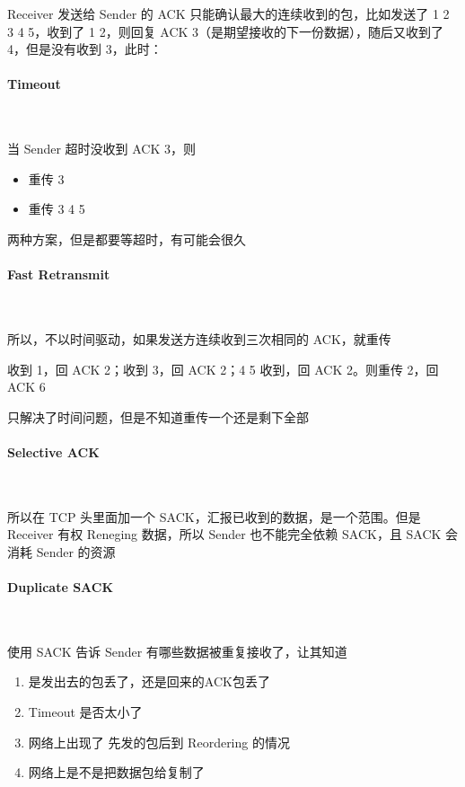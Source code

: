\documentclass[11pt,journal,compsoc]{IEEEtran}
\begin{document}
Receiver 发送给 Sender 的 ACK 只能确认最大的连续收到的包，比如发送了 1 2 3 4 5，收到了 1 2，则回复 ACK 3（是期望接收的下一份数据），随后又收到了 4，但是没有收到 3，此时：

\paragraph{Timeout} ~

当 Sender 超时没收到 ACK 3，则

\begin{itemize}
    \item 重传 3
    \item 重传 3 4 5
\end{itemize}

两种方案，但是都要等超时，有可能会很久

\paragraph{Fast Retransmit} ~

所以，不以时间驱动，如果发送方连续收到三次相同的 ACK，就重传

收到 1，回 ACK 2；收到 3，回 ACK 2；4 5 收到，回 ACK 2。则重传 2，回 ACK 6

只解决了时间问题，但是不知道重传一个还是剩下全部

\paragraph{Selective ACK} ~

所以在 TCP 头里面加一个 SACK，汇报已收到的数据，是一个范围。但是 Receiver 有权 Reneging 数据，所以 Sender 也不能完全依赖 SACK，且 SACK 会消耗 Sender 的资源

\paragraph{Duplicate SACK} ~

使用 SACK 告诉 Sender 有哪些数据被重复接收了，让其知道

\begin{enumerate}
    \item 是发出去的包丢了，还是回来的ACK包丢了

    \item Timeout 是否太小了

    \item 网络上出现了 先发的包后到 Reordering 的情况

    \item 网络上是不是把数据包给复制了
\end{enumerate}
\end{document}
